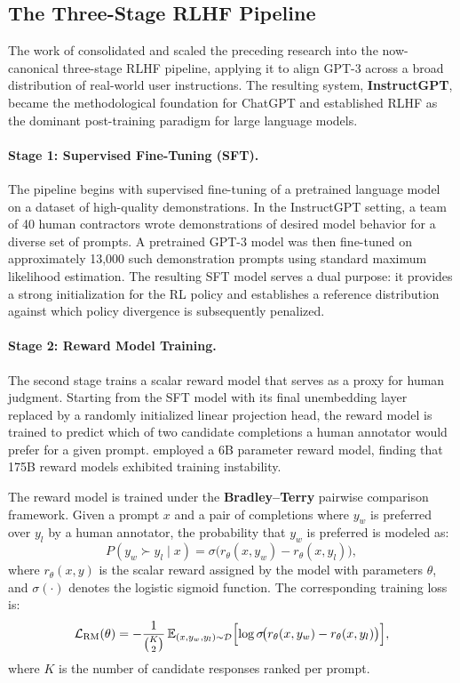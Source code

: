\documentclass[12pt,a4paper]{report}
\theoremstyle{definition}
\begin{document}
\subsection{The Three-Stage RLHF Pipeline}

The work of \cite{ouyang2022instructgpt} consolidated and scaled the preceding research into the now-canonical three-stage RLHF pipeline, applying it to align GPT-3 across a broad distribution of real-world user instructions. The resulting system, \textbf{InstructGPT}, became the methodological foundation for ChatGPT and established RLHF as the dominant post-training paradigm for large language models.

\paragraph{Stage 1: Supervised Fine-Tuning (SFT).}
The pipeline begins with supervised fine-tuning of a pretrained language model on a dataset of high-quality demonstrations. In the InstructGPT setting, a team of 40 human contractors wrote demonstrations of desired model behavior for a diverse set of prompts. A pretrained GPT-3 model was then fine-tuned on approximately 13,000 such demonstration prompts using standard maximum likelihood estimation. The resulting SFT model serves a dual purpose: it provides a strong initialization for the RL policy and establishes a reference distribution against which policy divergence is subsequently penalized.

\paragraph{Stage 2: Reward Model Training.}
The second stage trains a scalar reward model that serves as a proxy for human judgment. Starting from the SFT model with its final unembedding layer replaced by a randomly initialized linear projection head, the reward model is trained to predict which of two candidate completions a human annotator would prefer for a given prompt. \cite{ouyang2022instructgpt} employed a 6B parameter reward model, finding that 175B reward models exhibited training instability.

The reward model is trained under the \textbf{Bradley--Terry} pairwise comparison framework. Given a prompt $x$ and a pair of completions where $y_w$ is preferred over $y_l$ by a human annotator, the probability that $y_w$ is preferred is modeled as:
\begin{equation}
    P(y_w \succ y_l \mid x) = \sigma\!\bigl(r_\theta(x, y_w) - r_\theta(x, y_l)\bigr),
\end{equation}
where $r_\theta(x, y)$ is the scalar reward assigned by the model with parameters $\theta$, and $\sigma(\cdot)$ denotes the logistic sigmoid function. The corresponding training loss is:
\begin{equation}
    \mathcal{L}_{\text{RM}}(\theta) = -\frac{1}{\binom{K}{2}} \, \mathbb{E}_{(x, y_w, y_l) \sim \mathcal{D}} \Bigl[\log \sigma\!\bigl(r_\theta(x, y_w) - r_\theta(x, y_l)\bigr)\Bigr],
    \label{eq:rm_loss}
\end{equation}
where $K$ is the number of candidate responses ranked per prompt.
\end{document}
